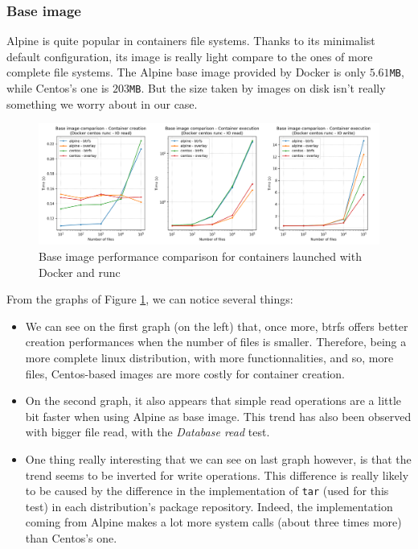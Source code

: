\subsubsection{Base image}

Alpine is quite popular in containers file systems.  Thanks to its minimalist default configuration, its image is really light compare to the ones of more complete file systems.  The Alpine base image provided by Docker is only $5.61$\texttt{MB}, while Centos's one is $203$\texttt{MB}.  But the size taken by images on disk isn't really something we worry about in our case.

\begin{figure}[h!]
  \begin{center}
    \includegraphics[width=\linewidth]{images/question-1-base-image.png}
    \caption{Base image performance comparison for containers launched with Docker and runc}
    \label{fig:q1:base-image}
  \end{center}
\end{figure}

From the graphs of Figure \ref{fig:q1:base-image}, we can notice several things:
\begin{itemize}
  \item We can see on the first graph (on the left) that, once more, btrfs offers better creation performances when the number of files is smaller.  Therefore, being a more complete linux distribution, with more functionnalities, and so, more files, Centos-based images are more costly for container creation.
  \item On the second graph, it also appears that simple read operations are a little bit faster when using Alpine as base image.  This trend has also been observed with bigger file read, with the \textit{Database read} test.
  \item One thing really interesting that we can see on last graph however, is that the trend seems to be inverted for write operations.  This difference is really likely to be caused by the difference in the implementation of \texttt{tar} (used for this test) in each distribution's package repository.  Indeed, the implementation coming from Alpine makes a lot more system calls (about three times more) than Centos's one.
\end{itemize}


